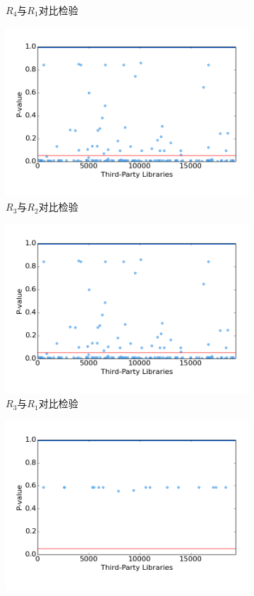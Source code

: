 \begin{figure}
\begin{subfigure}[b]{0.49\textwidth}
		\caption{$R_4$与$R_1$对比检验}
	\end{subfigure}
	\begin{subfigure}[b]{0.49\textwidth}
		\includegraphics[width=\textwidth]{figures/r3_r2}
		\caption{$R_3$与$R_2$对比检验}
	\end{subfigure}
	\begin{subfigure}[b]{0.49\textwidth}
		\includegraphics[width=\textwidth]{figures/r3_r2}
		\caption{$R_3$与$R_1$对比检验}
	\end{subfigure}
	\begin{subfigure}[b]{0.49\textwidth}
		\includegraphics[width=\textwidth]{figures/r2_r0}

\end{subfigure}
\end{figure}
